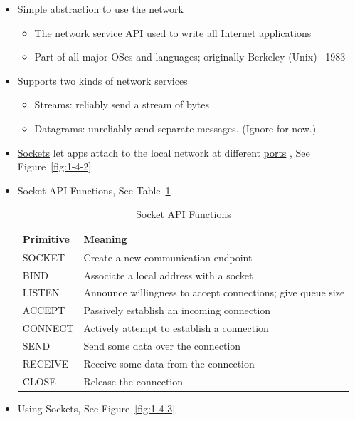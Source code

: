 \documentclass[12pt]{ctexart}   %
\begin{document}
	\begin{itemize}
		\item Simple abstraction to use the network
		\begin{itemize}
			\item The network service API used to write all Internet applications
			\item Part of all major OSes and languages; originally Berkeley (Unix) ~1983
		\end{itemize}
		
		\item Supports two kinds of network services
		\begin{itemize}
			\item Streams: reliably send a stream of bytes
			\item Datagrams: unreliably send separate messages. (Ignore for now.)
		\end{itemize}
		
		\item \underline{Sockets} let apps attach to the local network at different \underline{ports} , See Figure~\ref{fig:1-4-2}
		
		\item Socket API Functions, See Table~\ref{table:1-4-1}
		\begin{table}[h] 
		\begin{center}
		\begin{tabular}{p{3cm}|p{9cm}} 
		\hline
		\hline
		Primitive & Meaning \\
		\hline 
		SOCKET & Create a new communication endpoint\\
		\hline
		 BIND & Associate a local address with a socket\\
		\hline
		LISTEN & Announce willingness to accept connections; give queue size\\
		\hline
		ACCEPT & Passively establish an incoming connection\\
		\hline
		CONNECT & Actively attempt to establish a connection \\
		\hline
		SEND & Send some data over the connection \\
		\hline
		RECEIVE & Receive some data from the connection \\
		\hline
		CLOSE & Release the connection \\
		\hline
		\hline
		\end{tabular}
		\end{center}
		\caption{Socket API Functions} 
		\label{table:1-4-1}
		\end{table}
		
		\item Using Sockets, See Figure~\ref{fig:1-4-3}
	\end{itemize}
	
\end{document}
